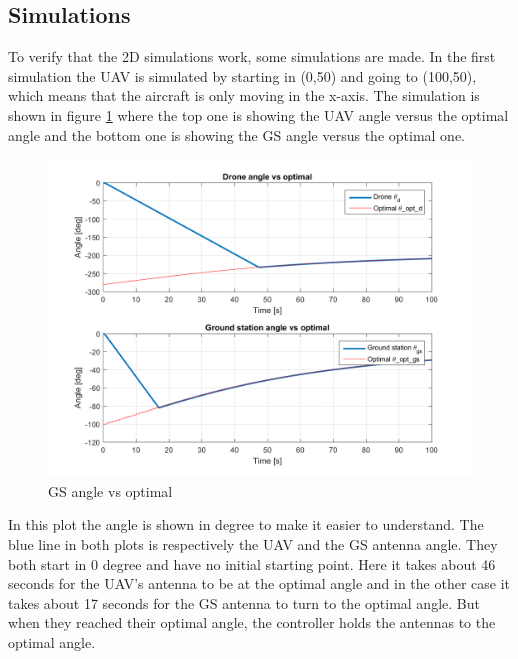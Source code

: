 \subsection{Simulations}
To verify that the 2D simulations work, some simulations are made. In the first simulation the UAV is simulated by starting in (0,50) and going to (100,50), which means that the aircraft is only moving in the x-axis. The simulation is shown in figure \ref{fig:gs_angle_vs_optimal} where the top one is showing the UAV angle versus the optimal angle and the bottom one is showing the GS angle versus the optimal one. 

\begin{figure}[h]
	\centering
	\includegraphics[scale=0.6]{figures/gs_angle_vs_optimal.png}
	\caption{GS angle vs optimal}
	\label{fig:gs_angle_vs_optimal}
\end{figure}

In this plot the angle is shown in degree to make it easier to understand. The blue line in both plots is respectively the UAV and the GS antenna angle. They both start in 0 degree and have no initial starting point. Here it takes about 46 seconds for the UAV's antenna to be at the optimal angle and in the other case it takes about 17 seconds for the GS antenna to turn to the optimal angle. But when they reached their optimal angle, the controller holds the antennas to the optimal angle. 
\newpage
